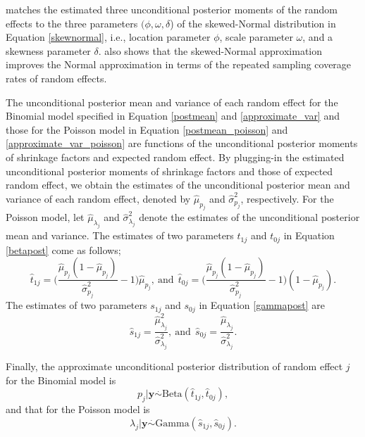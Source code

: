 \documentclass[article]{jss}
\begin{document}
\cite{kelly2014advances}  matches the estimated three unconditional posterior  moments of the random effects to the three parameters $(\phi, \omega, \delta$) of the skewed-Normal distribution in Equation \ref{skewnormal}, i.e., location parameter $\phi$, scale parameter $\omega$, and a skewness parameter $\delta$. \cite{kelly2014advances} also shows that the skewed-Normal approximation improves the Normal approximation \citep{tang2011, morris2012} in terms of the repeated sampling coverage rates of random effects.

The unconditional posterior mean and variance of each random effect for the Binomial model specified in Equation \ref{postmean} and \ref{approximate_var} and those for the Poisson model in Equation \ref{postmean_poisson} and \ref{approximate_var_poisson}  are functions of the unconditional posterior moments of shrinkage factors and expected random effect. By plugging-in the estimated unconditional posterior moments of shrinkage factors and those of expected random effect, we obtain the estimates of the unconditional posterior mean and variance of each random effect, denoted by $\hat{\mu}_{p_j}$ and $\hat{\sigma}^2_{p_j}$, respectively. For the Poisson model, let  $\hat{\mu}_{\lambda_j}$ and $\hat{\sigma}^2_{\lambda_j}$ denote the estimates of the unconditional posterior mean and variance. The estimates of two parameters $t_{1j}$ and $t_{0j}$ in Equation \ref{betapost} come as follows;
\begin{equation}\label{posttrueprob}
\hat{t}_{1j}=\bigg(\frac{\hat{\mu}_{p_j}(1-\hat{\mu}_{p_j})}{\hat{\sigma}^2_{p_j}}-1\bigg)\hat{\mu}_{p_j},~\textrm{and}~~\hat{t}_{0j}=\bigg(\frac{\hat{\mu}_{p_j}(1-\hat{\mu}_{p_j})}{\hat{\sigma}^2_{p_j}}-1\bigg)(1-\hat{\mu}_{p_j}).
\end{equation}
The estimates of two parameters $s_{1j}$ and $s_{0j}$ in Equation \ref{gammapost} are
\begin{equation}\label{posttrueprob}
\hat{s}_{1j}=\frac{\hat{\mu}_{\lambda_j}^2}{\hat{\sigma}^2_{\lambda_j}},~\textrm{and}~~\hat{s}_{0j}=\frac{\hat{\mu}_{\lambda_j}}{\hat{\sigma}^2_{\lambda_j}}.
\end{equation}


Finally, the approximate unconditional posterior distribution of random effect $j$ for the Binomial model is
\begin{equation}\label{trueapprox}
p_j\vert \boldsymbol{y} \stackrel{.}{\sim} \textrm{Beta}(\hat{t}_{1j}, \hat{t}_{0j}),
\end{equation}
and that for the Poisson model is
\begin{equation}\label{trueapprox_poisson}
\lambda_j\vert \boldsymbol{y} \stackrel{.}{\sim} \textrm{Gamma}(\hat{s}_{1j}, \hat{s}_{0j}).
\end{equation}
\end{document}
